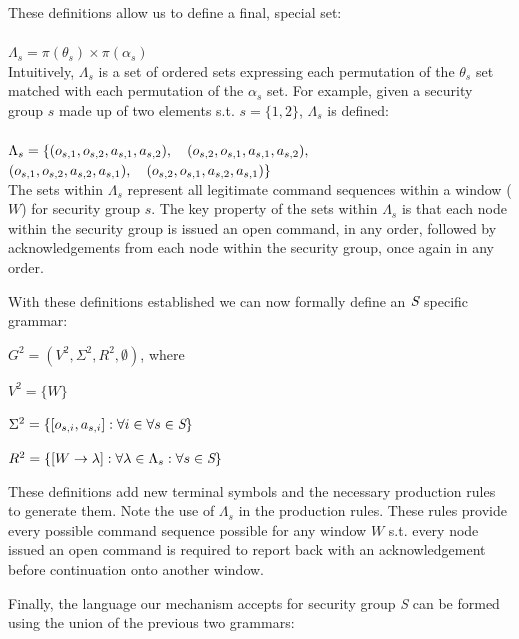 \documentclass{article}
\newcommand{\tab}{\hspace*{2em}}
\begin{document}
These definitions allow us to define a final, special set:\\
\\
$\Lambda_s = \pi(\theta_s) \times \pi(\alpha_s)$\\

Intuitively, $\Lambda_s$ is a set of ordered sets expressing each permutation of the $\theta_s$ set matched with each permutation of the $\alpha_s$ set. For example, given a security group $s$ made up of two elements s.t. $s = \{1, 2\}$, $\Lambda_s$ is defined:\\
\\
$\Lambda_s = \{ (o_{s,1}, o_{s,2}, a_{s,1}, a_{s,2}),\hspace*{1.0em} (o_{s,2}, o_{s,1}, a_{s,1}, a_{s,2}),$\\
\hspace*{3.0em}$ (o_{s,1}, o_{s,2}, a_{s,2}, a_{s,1}),\hspace*{1.0em} (o_{s,2}, o_{s,1}, a_{s,2}, a_{s,1})\}$\\

The sets within $\Lambda_s$ represent all legitimate command sequences within a window ($W$) for security group $s$. The key property of the sets within $\Lambda_s$ is that each node within the security group is issued an open command, in any order, followed by acknowledgements from each node within the security group, once again in any order.

With these definitions established we can now formally define an $\emph{S}$ specific grammar:

\tab $G^2 = (V^2, \Sigma^2, R^2, \emptyset)$, where

\tab $V^2 =\{W\}$

\tab $\Sigma ^2 = \{[o_{s,i}, a_{s,i}]:\forall i \in \forall s\in \emph{S}\}$

\tab $R^2 = \{[W\rightarrow \lambda  ] :\forall \lambda \in \Lambda_s :\forall s\in \emph{S}\}$


These definitions add new terminal symbols and the necessary production rules to generate them. Note the use of $\Lambda_s$ in the production rules. These rules provide every possible command sequence possible for any window $W$ s.t. every node issued an open command is required to report back with an acknowledgement before continuation onto another window.

Finally, the language our mechanism accepts for security group \emph{S} can be formed using the union of the previous two grammars:\\
\end{document}
